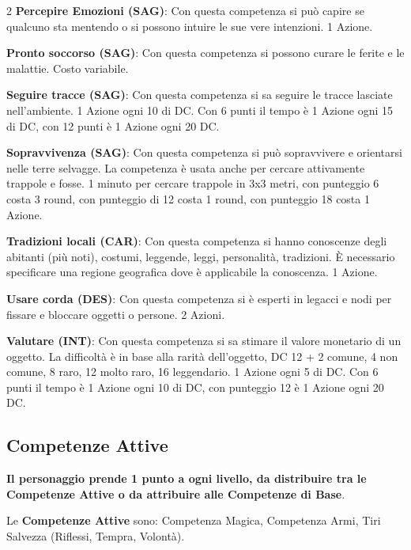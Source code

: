 \begin{multicols}{2}
\textbf{Percepire Emozioni (SAG)}: Con questa competenza si può capire se qualcuno sta mentendo o si possono intuire le sue vere intenzioni. 1 Azione.

\textbf{Pronto soccorso (SAG)}: Con questa competenza si possono curare le ferite e le malattie. Costo variabile.

\textbf{Seguire tracce (SAG)}: Con questa competenza si sa seguire le tracce lasciate nell'ambiente. 1 Azione ogni 10 di DC. Con 6 punti il tempo è 1 Azione ogni 15 di DC, con 12 punti è 1 Azione ogni 20 DC.

\textbf{Sopravvivenza (SAG)}: Con questa competenza si può sopravvivere e orientarsi nelle terre selvagge. La competenza è usata anche per cercare attivamente trappole e fosse. 1 minuto per cercare trappole in 3x3 metri, con punteggio 6 costa 3 round, con punteggio di 12 costa 1 round, con punteggio 18 costa 1 Azione.

\textbf{Tradizioni locali (CAR)}: Con questa competenza si hanno conoscenze degli abitanti (più noti), costumi, leggende, leggi, personalità, tradizioni. È necessario specificare una regione geografica dove è applicabile la conoscenza. 1 Azione.

\textbf{Usare corda (DES)}: Con questa competenza si è esperti in legacci e nodi per fissare e bloccare oggetti o persone. 2 Azioni.

\textbf{Valutare (INT)}: Con questa competenza si sa stimare il valore monetario di un oggetto. La difficoltà è in base alla rarità dell'oggetto, DC 12 + 2 comune, 4 non comune, 8 raro, 12 molto raro, 16 leggendario. 1 Azione ogni 5 di DC. Con 6 punti il tempo è 1 Azione ogni 10 di DC, con punteggio 12 è 1 Azione ogni 20 DC. \label{valutare}

\medskip

\subsection{Competenze Attive}\label{competenzeattive}

\textbf{Il personaggio prende 1 punto a ogni livello, da distribuire tra le Competenze Attive o da attribuire alle Competenze di Base}.

\medskip

Le \textbf{Competenze Attive} sono: Competenza Magica, Competenza Armi, Tiri Salvezza (Riflessi, Tempra, Volontà).

\noindent\begin{itemize}[leftmargin=*] \setlength{\itemsep}{0pt}


\end{itemize}
\end{multicols}
